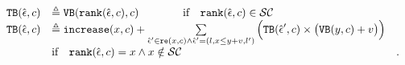 \begin{defn}
{%
\[ 
\begin{array}{lll}
  {\ensuremath{\mathtt{TB}}}(\hat{\mathtt{\epsilon}{}}, c) 
  & \triangleq {\ensuremath{\mathtt{VB}}}(\mathtt{rank}(\hat{\mathtt{\epsilon}{}}, c), c)   \qquad \qquad  \text{if} \quad  \mathtt{rank}(\hat{\mathtt{\epsilon}{}}, c) \in \mathcal{SC} & \\
  {\mathtt{TB}}(\hat{\mathtt{\epsilon}{}}, c) 
  & \triangleq \mathtt{increase}(x, c) 
   + 
  \sum\limits_{\hat{\mathtt{\epsilon}{}}' \in \mathtt{re}(x, c) \land \hat{\mathtt{\epsilon}{}}' = (l, x \leq y + v, l') }
  \Big( {\mathtt{TB}}(\hat{\mathtt{\epsilon}{}}', c) \times \big( {\mathtt{VB}}(y, c) + v \big) \Big)
  & \\
  &  \text{if} \quad  \mathtt{rank}(\hat{\mathtt{\epsilon}{}}, c) = x \land x \notin \mathcal{SC} &.
\end{array}
  \]
}
\end{defn}
